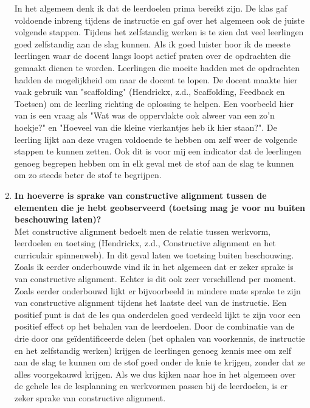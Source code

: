 \documentclass{article}
\begin{document}
\begin{enumerate}[label=(\alph*)]
                        In het algemeen denk ik dat de leerdoelen prima bereikt zijn. De klas gaf voldoende inbreng tijdens de instructie en gaf over het algemeen ook de juiste volgende stappen. Tijdens het zelfstandig werken is te zien dat veel leerlingen goed zelfstandig aan de slag kunnen. Als ik goed luister hoor ik de meeste leerlingen waar de docent langs loopt actief praten over de opdrachten die gemaakt dienen te worden. Leerlingen die moeite hadden met de opdrachten hadden de mogelijkheid om naar de docent te lopen. De docent maakte hier vaak gebruik van "scaffolding" (Hendrickx, z.d., Scaffolding, Feedback en Toetsen) om de leerling richting de oplossing te helpen. Een voorbeeld hier van is een vraag als "Wat was de oppervlakte ook alweer van een zo'n hoekje?" en "Hoeveel van die kleine vierkantjes heb ik hier staan?". De leerling lijkt aan deze vragen voldoende te hebben om zelf weer de volgende stappen te kunnen zetten. Ook dit is voor mij een indicator dat de leerlingen genoeg begrepen hebben om in elk geval met de stof aan de slag te kunnen om zo steeds beter de stof te begrijpen.
                
                    \item \textbf{In hoeverre is sprake van constructive alignment tussen de elementen die je hebt geobserveerd (toetsing mag je voor nu buiten beschouwing laten)?} \\
                
                        Met constructive alignment bedoelt men de relatie tussen werkvorm, leerdoelen en toetsing (Hendrickx, z.d., Constructive alignment en het curriculair spinnenweb). In dit geval laten we toetsing buiten beschouwing. Zoals ik eerder onderbouwde vind ik in het algemeen dat er zeker sprake is van constructive alignment. Echter is dit ook zeer verschillend per moment. Zoals eerder onderbouwd lijkt er bijvoorbeeld in mindere mate sprake te zijn van constructive alignment tijdens het laatste deel van de instructie. Een positief punt is dat de les qua onderdelen goed verdeeld lijkt te zijn voor een positief effect op het behalen van de leerdoelen. Door de combinatie van de drie door ons geïdentificeerde delen (het ophalen van voorkennis, de instructie en het zelfstandig werken) krijgen de leerlingen genoeg kennis mee om zelf aan de slag te kunnen om de stof goed onder de knie te krijgen, zonder dat ze alles voorgekauwd krijgen. Als we dus kijken naar hoe in het algemeen over de gehele les de lesplanning en werkvormen passen bij de leerdoelen, is er zeker sprake van constructive alignment.
                \end{enumerate}
\end{document}
